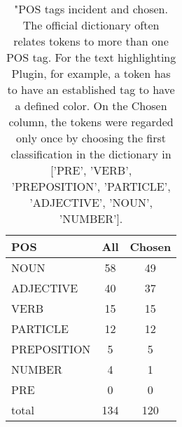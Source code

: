 \begin{table*}[h!]
\begin{center}
\caption{"POS tags incident and chosen.
            The official dictionary often relates tokens
            to more than one POS tag.
            For the text highlighting Plugin, for example,
            a token has to have an established tag to have
            a defined color.
            On the Chosen column, the tokens were regarded only once
            by choosing the first classification in the dictionary in ['PRE', 'VERB', 'PREPOSITION', 'PARTICLE', 'ADJECTIVE', 'NOUN', 'NUMBER'].}\label{foobar}
\begin{tabular}{| l | c | c |}\hline
POS & All  & Chosen \\\hline
NOUN & 58  & 49 \\\hline
ADJECTIVE & 40  & 37 \\\hline
VERB & 15  & 15 \\\hline
PARTICLE & 12  & 12 \\\hline
PREPOSITION & 5  & 5 \\\hline
NUMBER & 4  & 1 \\\hline
PRE & 0  & 0 \\\hline
total & 134  & 120 \\\hline
\end{tabular}\end{center}
\end{table*}